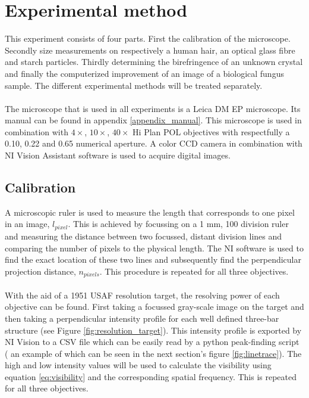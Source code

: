 \section{Experimental method}

This experiment consists of four parts. First the calibration of the microscope. Secondly size measurements on respectively a human hair, an optical glass fibre and starch particles. Thirdly determining the birefringence of an unknown crystal and finally the computerized improvement of an image of a biological fungus sample. The different experimental methods will be treated separately.\\
\\
The microscope that is used in all experiments is a Leica DM EP microscope. Its manual can be found in appendix \ref{appendix_manual}. This microscope is used in combination with $4\times$, $10\times$, $40\times$ Hi Plan POL objectives with respectfully a 0.10, 0.22 and 0.65 numerical aperture. A color CCD camera in combination with NI Vision Assistant software is used to acquire digital images.

\subsection{Calibration}
\label{expmeth_calibration}
A microscopic ruler is used to measure the length that corresponds to one pixel in an image, $l_{pixel}$. This is achieved by focussing on a 1 mm, 100 division ruler and measuring the distance between two focussed, distant division lines and comparing the number of pixels to the physical length. The NI software is used to find the exact location of these two lines and subsequently find the perpendicular projection distance, $n_{pixels}$. This procedure is repeated for all three objectives. \\
\\
With the aid of a 1951 USAF resolution target, the resolving power of each objective can be found. First taking a focussed gray-scale image  on the target and then taking a perpendicular intensity profile for each well defined three-bar structure (see Figure \ref{fig:resolution_target}). This intensity profile is exported by NI Vision to a CSV file which can be easily read by a python peak-finding script ( an example of which can be seen in the next section's figure \ref{fig:linetrace}). The high and low intensity values will be used to calculate the visibility using equation \ref{eq:visibility} and the corresponding spatial frequency. This is repeated for all three objectives.

